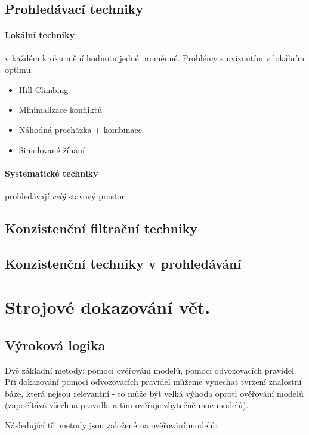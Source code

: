 \documentclass[a4paper]{article}      %
\begin{document}
\subsection{Prohledávací techniky}

\paragraph{Lokální techniky} v každém kroku mění hodnotu jedné proměnné. Problémy s uvíznutím v lokálním optimu.
\begin{itemize}
\item Hill Climbing
\item Minimalizace konfliktů
\item Náhodná procházka + kombinace
\item Simulované žíhání
\end{itemize}

\paragraph{Systematické techniky} prohledávají \emph{celý} stavový prostor

\subsection{Konzistenční filtrační techniky}

\subsection{Konzistenční techniky v prohledávání}

\section{Strojové dokazování vět.}

\subsection{Výroková logika}
Dvě základní metody: pomocí ověřování modelů, pomocí odvozovacích pravidel.
Při dokazování pomocí odvozovacích pravidel můžeme vynechat tvrzení znalostní báze, která nejsou relevantní - to může být velká výhoda oproti ověřování modelů (započítává všechna pravidla a tím ověřuje zbytečně moc modelů).

Následující tři metody jsou založené na ověřování modelů:
\end{document}

